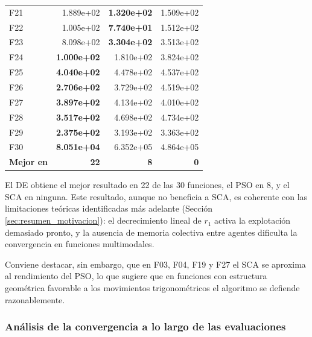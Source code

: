 \documentclass[12pt,a4paper]{article}
\begin{document}
\begin{longtable}{lrrr}
F21  & 1.889e+02 & \textbf{1.320e+02} & 1.509e+02 \\
F22  & 1.005e+02 & \textbf{7.740e+01} & 1.512e+02 \\
F23  & 8.098e+02 & \textbf{3.304e+02} & 3.513e+02 \\
F24  & \textbf{1.000e+02} & 1.810e+02 & 3.824e+02 \\
F25  & \textbf{4.040e+02} & 4.478e+02 & 4.537e+02 \\
F26  & \textbf{2.706e+02} & 3.729e+02 & 4.519e+02 \\
F27  & \textbf{3.897e+02} & 4.134e+02 & 4.010e+02 \\
F28  & \textbf{3.517e+02} & 4.698e+02 & 4.734e+02 \\
F29  & \textbf{2.375e+02} & 3.193e+02 & 3.363e+02 \\
F30  & \textbf{8.051e+04} & 6.352e+05 & 4.864e+05 \\
\midrule
\textbf{Mejor en} & \textbf{22} & \textbf{8} & \textbf{0} \\
\end{longtable}
 
El DE obtiene el mejor resultado en 22 de las 30 funciones, el PSO en 8, y el SCA en ninguna. Este resultado, aunque no beneficia a SCA, es coherente con las limitaciones teóricas identificadas más adelante (Sección \ref{sec:resumen_motivacion}): el decrecimiento lineal de $r_1$ activa la explotación demasiado pronto, y la ausencia de memoria colectiva entre agentes dificulta la convergencia en funciones multimodales.
 
Conviene destacar, sin embargo, que en F03, F04, F19 y F27 el SCA se aproxima al rendimiento del PSO, lo que sugiere que en funciones con estructura geométrica favorable a los movimientos trigonométricos el algoritmo se defiende razonablemente.
 
\subsubsection{Análisis de la convergencia a lo largo de las evaluaciones}
 
\end{document}
